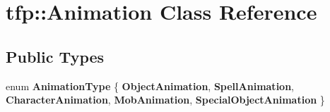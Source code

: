 \hypertarget{classtfp_1_1_animation}{}\section{tfp\+:\+:Animation Class Reference}
\label{classtfp_1_1_animation}
\subsection*{Public Types}
\begin{DoxyCompactItemize}
\item 
\mbox{\label{classtfp_1_1_animation_a42e68c7dc28f80cc952fa0e990928c68}} 
enum {\bfseries Animation\+Type} \{ \newline
{\bfseries Object\+Animation}, 
{\bfseries Spell\+Animation}, 
{\bfseries Character\+Animation}, 
{\bfseries Mob\+Animation}, 
\newline
{\bfseries Special\+Object\+Animation}
 \}
\end{DoxyCompactItemize}
